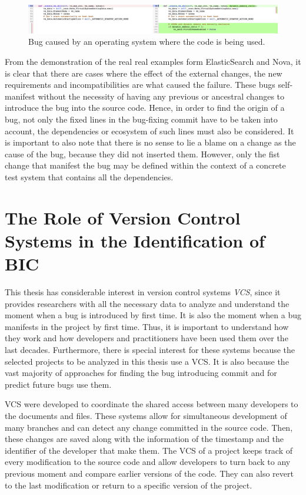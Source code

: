 \documentclass[a4paper, 12pt]{book}
\begin{document}
\begin{figure}[ht]
\centering
\includegraphics[width=\columnwidth]{img/windowsIssuefix.png}
\caption{Bug caused by an operating system where the code is being used.}
\label{fig:windowsissuefix}       %
\end{figure}

From the demonstration of the real real examples form ElasticSearch and Nova, it is clear that there are cases where  the effect of the external changes, the new requirements and incompatibilities are what caused the failure. These bugs self-manifest without the necessity of having any previous or ancestral changes to introduce the bug into the source code. Hence, in order to find the origin of a bug, not only the fixed lines in the bug-fixing commit  have to be taken into account, the dependencies or ecosystem of such lines must also be considered. It is important to also note that there is no sense to lie a blame on a change as the cause of the bug, because they did not inserted them. However, only the fist change that manifest the bug may be defined within the context of a concrete test system that contains all the dependencies.

\section{The Role of Version Control Systems in the Identification of BIC}
\label{subsec:VCS}

This thesis has considerable interest in version control systems \emph{VCS}, since it provides researchers with all the necessary data to analyze and understand the moment when a bug is introduced by first time. It is also the moment when a bug manifests in the project by first time. Thus, it is important to understand how they work and how developers and practitioners have been used them over the last decades. Furthermore, there is special interest for these systems because the selected projects to be analyzed in this thesis use a VCS. It is also because the vast majority of approaches for finding the bug introducing commit and for predict future bugs use them. 

VCS were developed to coordinate the shared access between many developers to the documents and files. These systems allow for simultaneous development of many branches and can detect any change committed in the source code. Then, these changes are saved along with the information of the timestamp and the identifier of the developer that make them. The VCS of a project keeps track of every modification to the source code and allow developers to turn back to any previous moment and compare earlier versions of the code. They can also revert to the last modification or return to a specific version of the project.
\end{document}

